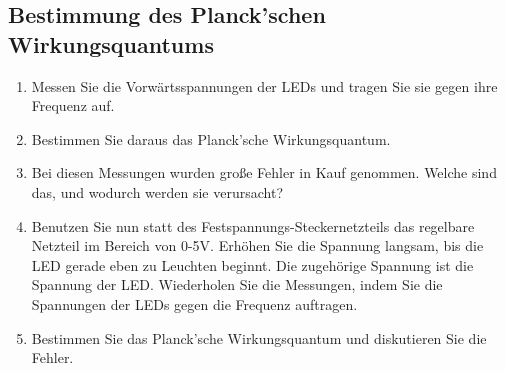 \subsection{Bestimmung des Planck'schen Wirkungsquantums}
\begin{enumerate}
	\item Messen Sie die Vorwärtsspannungen der LEDs und tragen Sie sie gegen ihre Frequenz auf.
	\item Bestimmen Sie daraus das Planck'sche Wirkungsquantum.
	\item Bei diesen Messungen wurden große Fehler in Kauf genommen. Welche sind das, und wodurch werden sie verursacht?
	\item Benutzen Sie nun statt des Festspannungs-Steckernetzteils das regelbare Netzteil im Bereich von 0-5V. Erhöhen Sie die Spannung langsam, bis die LED gerade eben zu Leuchten beginnt. Die zugehörige Spannung ist die Spannung der LED. Wiederholen Sie die Messungen, indem Sie die Spannungen der LEDs gegen die Frequenz auftragen.
	\item Bestimmen Sie das Planck'sche Wirkungsquantum und diskutieren Sie die Fehler.
\end{enumerate}